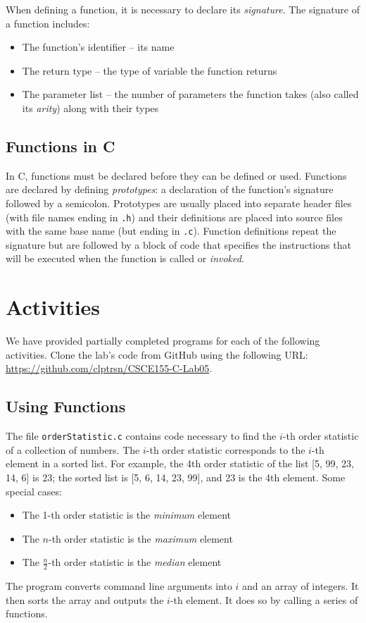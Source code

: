 \documentclass[12pt]{scrartcl}
\begin{document}
When defining a function, it is necessary to declare its \emph{signature}.  
The signature of a function includes:
\begin{itemize}
  \item The function's identifier -- its name 
  \item The return type -- the type of variable the function returns
  \item The parameter list -- the number of parameters the function takes 
	(also called its \emph{arity}) along with their types 
\end{itemize}

\subsection{Functions in C}

In C, functions must be declared before they can be defined or used.  
Functions are declared by defining \emph{prototypes}: a 
declaration of the function's signature followed by a semicolon.  
Prototypes are usually placed into separate header files (with file
names ending in \texttt{.h}) and their definitions are
placed into source files with the same base name (but ending in 
\texttt{.c}).  Function definitions repeat the signature 
but are followed by a block of code that specifies the 
instructions that will be executed when the function is called or
\emph{invoked}.

\section{Activities}

We have provided partially completed programs for each of the 
following activities.  Clone the lab's code from GitHub using the 
following URL: \url{https://github.com/clptrsn/CSCE155-C-Lab05}.

\subsection{Using Functions}

The file \texttt{orderStatistic.c} contains code necessary
to find the $i$-th order statistic of a collection of numbers.   
The $i$-th order statistic corresponds to the $i$-th element in a 
sorted list.  For example, the 4th order statistic of the list 
[5, 99, 23, 14, 6] is 23; the sorted list is [5, 6, 14, 23, 99], 
and 23 is the 4th element.  Some special cases:
\begin{itemize}
  \item The 1-th order statistic is the \emph{minimum} element
  \item The $n$-th order statistic is the \emph{maximum} element
  \item The $\frac{n}{2}$-th order statistic is the \emph{median} element
\end{itemize}
The program converts command line arguments into $i$ and an
array of integers.  It then sorts the array and outputs the $i$-th 
element.  It does so by calling a series of functions.
\end{document}
